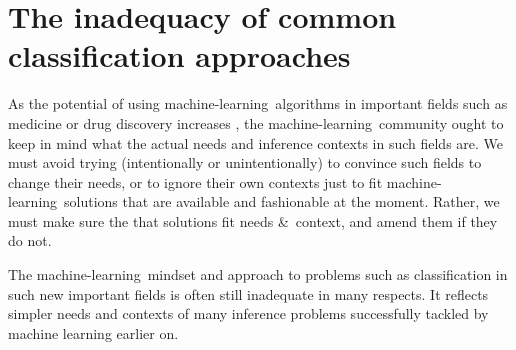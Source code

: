 \documentclass[\ifafour a4paper,12pt,\else a5paper,10pt,\fi%
onecolumn,oneside,article,%
british%
]{memoir}
\theoremstyle{remark}
\theoremstyle{innote}
\newcommand*{\amp}{\&}
\newcommand*{\asudedication}[1]{%
{\par\centering\textit{#1}\par}}
\renewcommand*{\|}[1][]{\nonscript\:#1\vert\nonscript\:\mathopen{}}
\newcommand*{\ml}{machine-learning}
\begin{document}
\frenchspacing





\section{The inadequacy of common classification approaches}
\label{sec:goal_class}

As the potential of using \ml\ algorithms in important fields such as medicine or drug discovery increases \autocites{lundervoldetal2019,chenetal2018,green2019}, the \ml\ community ought to keep in mind what the actual needs and inference contexts in such fields are. We must avoid trying (intentionally or unintentionally) to convince such fields to change their needs, or to ignore their own contexts just to fit \ml\ solutions that are available and fashionable at the moment. Rather, we must make sure the that solutions fit needs \amp\ context, and amend them if they do not.

The \ml\ mindset and approach to problems such as classification in such new important fields is often still inadequate in many respects. It reflects simpler needs and contexts of many  inference problems successfully tackled by machine learning earlier on.
\end{document}
